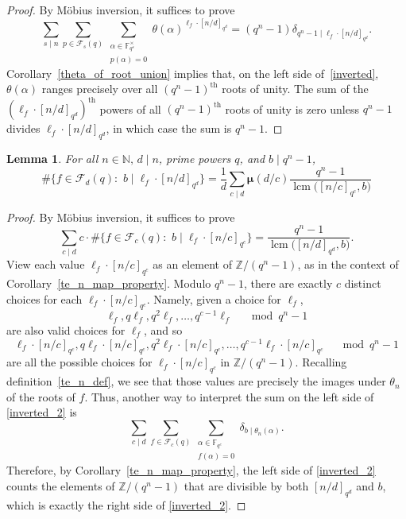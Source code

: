 \documentclass[10pt]{article}
\newtheorem{lemma}[theorem]{Lemma}
\theoremstyle{definition}
\DeclareMathOperator{\lcm}{lcm}
\newcommand{\F}{\mathbb{F}}
\newcommand{\CF}{\mathcal{F}}
\newcommand{\N}{\mathbb{N}}
\newcommand{\Z}{\mathbb{Z}}
\newcommand{\moebius}{\pmb{\mu}}
\newcommand{\te}{\theta}
\begin{document}
\begin{proof}
By M\"obius inversion, it suffices to prove
\begin{equation}
\label{inverted}
\sum_{s \mid n}
\sum_{p \in \CF_s (q)}
\sum_{\substack{\alpha \in \F_{q^s}^\times \\ p(\alpha) = 0}}
\te (\alpha)^{\ell_f \cdot [n/d]_{q^d}}
=
(q^n - 1) \delta_{q^n - 1 \mid \ell_f \cdot [n/d]_{q^d}}.
\end{equation}
Corollary~\ref{theta_of_root_union} implies that, on the left side of~\eqref{inverted}, \(\te(\alpha)\) ranges precisely over all \((q^n-1)^\text{th}\) roots of unity.
The sum of the \((\ell_f \cdot [n/d]_{q^d})^\text{th}\) powers of all \((q^n-1)^\text{th}\) roots of unity is zero unless \(q^n-1\) divides \(\ell_f \cdot [n/d]_{q^d}\), in which case the sum is \(q^n-1\).
\end{proof}


\begin{lemma}
\label{post_pre_pre_main}
For all \(n \in \N, \, d \mid n\), prime powers \(q\), and \(b \mid q^n-1\),
\begin{equation}
\# \{f \in \CF_d (q) : \, \, b \mid \ell_f \cdot [n/d]_{q^d}\}
=
\frac{1}{d}
\sum_{c \mid d}
\moebius(d/c)
\frac{q^n-1}{\lcm \big (
[n/c]_{q^c}, b
\big )}
\end{equation}
\end{lemma}


\begin{proof}
By M\"obius inversion, it suffices to prove
\begin{equation}
\label{inverted_2}
\sum_{c \mid d} c \cdot \# \{f \in \CF_c (q) : \, \, b \mid \ell_f \cdot [n/c]_{q^c} \}
=
\frac{q^n-1}{\lcm \big (
[n/d]_{q^d}, b
\big )}.
\end{equation}
View each value \(\ell_f \cdot [n/c]_{q^c}\) as an element of \(\Z / (q^n-1)\), as in the context of Corollary~\ref{te_n_map_property}.
Modulo \(q^n-1\), there are exactly \(c\) distinct choices for each \(\ell_f \cdot [n/c]_{q^c}\).
Namely, given a choice for \(\ell_f\),
\[
\ell_f , q\ell_f , q^2\ell_f , \ldots, q^{c-1}\ell_f \quad \mod q^n-1
\]
are also valid choices for \(\ell_f\), and so
\[
\ell_f \cdot [n/c]_{q^c}, q\ell_f \cdot [n/c]_{q^c} , q^2 \ell_f \cdot [n/c]_{q^c} , \ldots, q^{c-1}\ell_f \cdot [n/c]_{q^c} \quad \mod q^n-1
\]
are all the possible choices for \(\ell_f \cdot [n/c]_{q^c}\) in \(\Z / (q^n-1)\).
Recalling definition~\eqref{te_n_def}, we see that those values are precisely the images under \(\te_n\) of the roots of \(f\).
Thus, another way to interpret the sum on the left side of \eqref{inverted_2} is
\[
\sum_{c \mid d} \sum_{f \in \CF_c (q)} \sum_{\substack{\alpha \in \F_{q^c} \\ f(\alpha) = 0}} \delta_{b \mid \te_n(\alpha)}.
\]
Therefore, by Corollary~\ref{te_n_map_property}, the left side of \eqref{inverted_2} counts the elements of \(\Z / (q^n-1)\) that are divisible by both \([n/d]_{q^d}\) and \(b\),
which is exactly the right side of \eqref{inverted_2}.
\end{proof}
\end{document}
